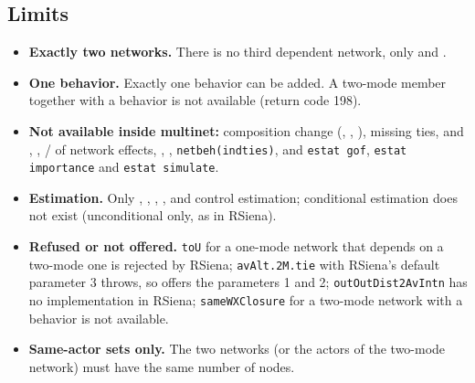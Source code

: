 \subsection{Limits}\label{sec:mn-limits}

\begin{itemize}
\item \textbf{Exactly two networks.} There is no third dependent network, only  and .
\item \textbf{One behavior.} Exactly one behavior can be added. A two-mode member together with a behavior is not available (return code 198).
\item \textbf{Not available inside multinet:} composition change (, , ), missing ties,  and , , / of network effects, , , \texttt{netbeh(indties)}, and \texttt{estat gof}, \texttt{estat importance} and \texttt{estat simulate}.
\item \textbf{Estimation.} Only , , , ,  and  control estimation; conditional estimation does not exist (unconditional only, as in RSiena).
\item \textbf{Refused or not offered.} \texttt{toU} for a one-mode network that depends on a two-mode one is rejected by RSiena; \texttt{avAlt.2M.tie} with RSiena's default parameter 3 throws, so \nwsaom{} offers the parameters 1 and 2; \texttt{outOutDist2AvIntn} has no implementation in RSiena; \texttt{sameWXClosure} for a two-mode network with a behavior is not available.
\item \textbf{Same-actor sets only.} The two networks (or the actors of the two-mode network) must have the same number of nodes.
\end{itemize}
\endgroup

